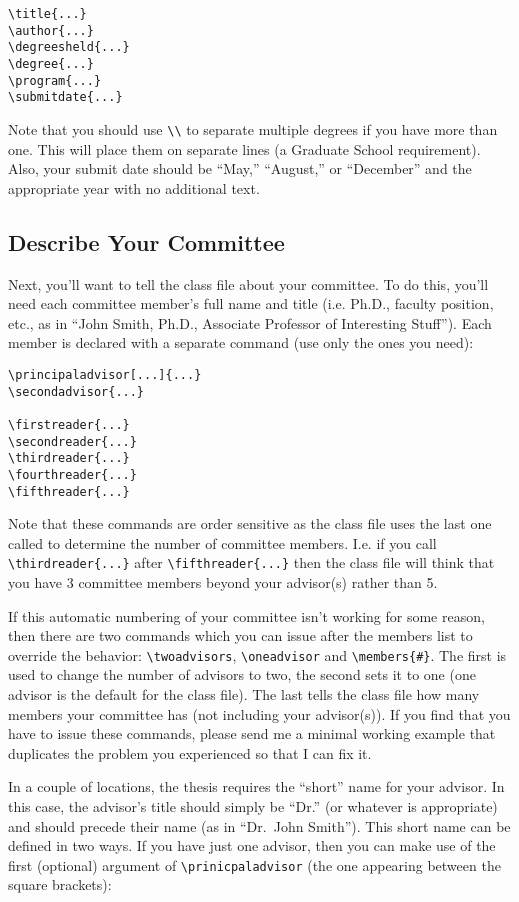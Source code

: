 \begin{verbatim}
\title{...}
\author{...}
\degreesheld{...}
\degree{...}
\program{...}
\submitdate{...}
\end{verbatim}

Note that you should use \verb=\\= to separate multiple degrees if you have more than one.  This will place them on separate lines (a Graduate School requirement).  Also, your submit date should be ``May,'' ``August,'' or ``December'' and the appropriate year with no additional text.

\subsection{Describe Your Committee}\label{comm}
Next, you'll want to tell the class file about your committee.  To do this, you'll need each committee member's full name and title (i.e. Ph.D., faculty position, etc., as in ``John Smith, Ph.D., Associate Professor of Interesting Stuff'').  Each member is declared with a separate command (use only the ones you need):

\begin{verbatim}
\principaladvisor[...]{...}
\secondadvisor{...}

\firstreader{...}
\secondreader{...}
\thirdreader{...}
\fourthreader{...}
\fifthreader{...}
\end{verbatim}

Note that these commands are order sensitive as the class file uses the last one called to determine the number of committee members.  I.e. if you call \verb=\thirdreader{...}= after \verb=\fifthreader{...}= then the class file will think that you have 3 committee members beyond your advisor(s) rather than 5.

If this automatic numbering of your committee isn't working for some reason, then there are two commands which you can issue after the members list to override the behavior: \verb=\twoadvisors=, \verb=\oneadvisor= and \verb=\members{#}=.  The first is used to change the number of advisors to two, the second sets it to one (one advisor is the default for the class file).  The last tells the class file how many members your committee has (not including your advisor(s)).  If you find that you have to issue these commands, please send me a minimal working example that duplicates the problem you experienced so that I can fix it.

In a couple of locations, the thesis requires the ``short'' name for your advisor.  In this case, the advisor's title should simply be ``Dr.'' (or whatever is appropriate) and should precede their name (as in ``Dr.~John Smith'').  This short name can be defined in two ways.  If you have just one advisor, then you can make use of the first (optional) argument of \verb=\prinicpaladvisor= (the one appearing between the square brackets):

